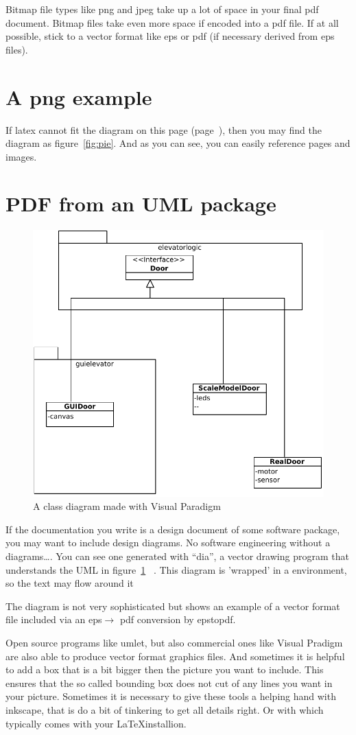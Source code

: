 Bitmap file types like png and jpeg take up a lot of space in your
final pdf document. 
Bitmap files take even more space if encoded into a pdf file.
If at all possible, stick to a vector format like eps or pdf (if
necessary derived from eps files). 


\section{A png example}
\label{page:pngexample}
If latex cannot fit the diagram on this page
(page~\pageref{page:pngexample}), 
 then you may find the diagram as figure~\vref{fig:pie}. And as you
 can see, you can easily reference pages and images.

\section{PDF from an UML package} 
\label{sec:pdffromuml}
\begin{figure}
  \includegraphics[width=.4\textwidth]{images/doorsystem.pdf}
  \caption{A class diagram made with Visual Paradigm}
  \label{fig:classdiagram}
\end{figure}
If the documentation you write is a design document of some software
package, you may want to include design diagrams.
No software engineering without a  diagrams\ldots.
You can see one generated with ``dia'', a vector drawing program that
understands the UML in figure~\ref{fig:classdiagram}
~. This diagram is 'wrapped' in a  environment, so the text may flow around it

The diagram is not very sophisticated but shows an example of a vector
format file included via an eps$\rightarrow$ pdf conversion by
epstopdf.

Open source programs like umlet, but also commercial ones like Visual Pradigm are also able to produce
vector format graphics files. And sometimes it is helpful to add a box
that is a bit bigger then the picture you want to include.
This ensures that the so called bounding box does not cut of any lines
you want in your picture. Sometimes it is necessary to give these
tools a helping hand with inkscape, that is do a bit of tinkering to
get all details right. Or with  which typically comes with your \LaTeX installion.

